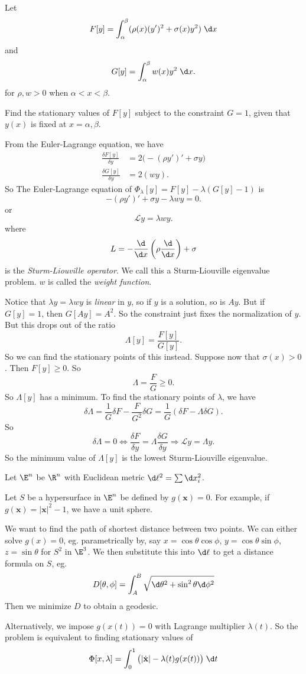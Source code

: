\documentclass[a4paper]{article}
\begin{document}
\begin{eg}
  Let 
  \[
    F[y] = \int_\alpha^\beta (\rho(x)(y')^2 + \sigma(x)y^2)\;\d x
  \]
  and
  \[
    G[y] = \int_\alpha^\beta w(x)y^2\;\d x.
  \]
  for $\rho, w> 0$ when $\alpha < x < \beta$.

  Find the stationary values of $F[y]$ subject to the constraint $G = 1$, given that $y(x)$ is fixed at $x = \alpha, \beta$.

  From the Euler-Lagrange equation, we have
  \begin{align*}
    \frac{\delta F[y]}{\delta y} &= 2\big(-(\rho y')' + \sigma y\big)\\
    \frac{\delta G[y]}{\delta y} &= 2 (wy).
  \end{align*}
  So The Euler-Lagrange equation of $\Phi_\lambda [y] = F[y] - \lambda(G[y] - 1)$ is
  \[
    -(\rho y')' + \sigma y - \lambda wy = 0.
  \]
  or
  \[
    \mathcal{L}y = \lambda wy.
  \]
  where
  \[
    L = -\frac{\d}{\d x}\left(\rho\frac{\d}{\d x}\right) + \sigma
  \]
  is the \emph{Sturm-Liouville operator}. We call this a Sturm-Liouville eigenvalue problem. $w$ is called the \emph{weight function}.

  Notice that $\lambda y = \lambda wy$ is \emph{linear} in $y$, so if $y$ is a solution, so is $Ay$. But if $G[y ] = 1$, then $G[Ay] = A^2$. So the constraint just fixes the normalization of $y$. But this drops out of the ratio
  \[
    \Lambda [y] = \frac{F[y]}{G[y]}.
  \]
  So we can find the stationary points of this instead. Suppose now that $\sigma(x) > 0$. Then $F[y] \geq 0$. So
 \[
    \Lambda = \frac{F}{G} \geq 0.
  \]
  So $\Lambda[y]$ has a minimum. To find the stationary points of $\lambda$, we have
  \[
    \delta\Lambda = \frac{1}{G}\delta F - \frac{F}{G^2} \delta G = \frac{1}{G}(\delta F - \Lambda \delta G).
  \]
  So
  \[
    \delta \Lambda = 0 \Leftrightarrow \frac{\delta F}{\delta y} = \Lambda \frac{\delta G}{\delta y} \Rightarrow \mathcal{L} y = \Lambda y.
  \]
  So the minimum value of $\Lambda[y]$ is the lowest Sturm-Liouville eigenvalue.
\end{eg}

\begin{eg}
  Let $\E^n$ be $\R^n$ with Euclidean metric $\d \ell^2 = \sum \d x_i^2$.

  Let $S$ be a hypersurface in $\E^n$ be defined by $g(\mathbf{x}) = 0$. For example, if $g(\mathbf{x}) = |\mathbf{x}|^2 - 1$, we have a unit sphere.

  We want to find the path of shortest distance between two points. We can either solve $g(x) = 0$, eg. parametrically by, say $x = \cos \theta \cos \phi$, $y = \cos \theta \sin \phi$, $z = \sin \theta$ for $S^2$ in $\E^3$. We then substitute this into $\d \ell$ to get a distance formula on $S$, eg.
  \[
    D[\theta, \phi] = \int_A^B \sqrt{\d \theta^2 + \sin^2 \theta \d \phi^2}
  \]
  Then we minimize $D$ to obtain a geodesic.

  Alternatively, we impose $g(x(t)) = 0$ with Lagrange multiplier $\lambda(t)$. So the problem is equivalent to finding stationary values of
  \[
    \Phi[x, \lambda] = \int_0^1 \big(|\dot{\mathbf{x}}| - \lambda(t) g(x(t))\big)\;\d t
  \]
\end{eg}
\end{document}
